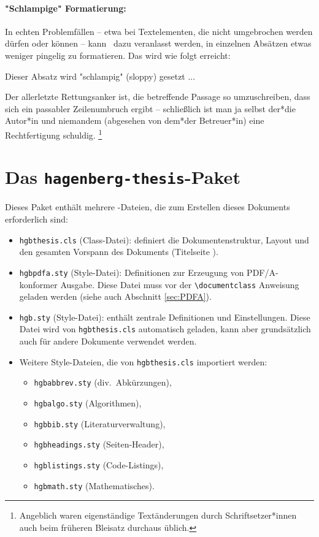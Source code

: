 \paragraph{"Schlampige" Formatierung:} In echten Problemfällen -- etwa bei
Textelementen, die nicht umgebrochen werden dürfen oder können -- kann
\latex\ dazu veranlasst werden, in einzelnen Absätzen etwas weniger pingelig
zu formatieren. Das wird wie folgt erreicht:
%
\begin{LaTeXCode}[numbers=none]
\begin{sloppypar}
	Dieser Absatz wird "schlampig" (sloppy) gesetzt ...
\end{sloppypar}
\end{LaTeXCode}
%
Der allerletzte Rettungsanker ist, die betreffende Passage so umzuschreiben,
dass sich ein passabler Zeilenumbruch ergibt -- schließlich ist man ja selbst
der*die Autor*in und niemandem (abgesehen von dem*der Betreuer*in) eine
Rechtfertigung schuldig.%
\footnote{Angeblich waren eigenständige Textänderungen durch Schriftsetzer*innen
auch beim früheren Bleisatz durchaus üblich.}


\section{Das \texttt{hagenberg-thesis}-Paket}

Dieses Paket enthält mehrere \latex-Dateien, die zum Erstellen dieses
Dokuments erforderlich sind:
%
\begin{itemize}
  \item \nolinkurl{hgbthesis.cls} (Class-Datei): definiert die
    Dokumentenstruktur, Layout und den gesamten Vorspann des Dokuments
    (Titelseite \etc).
  \item \nolinkurl{hgbpdfa.sty} (Style-Datei): Definitionen zur
    Erzeugung von PDF/A-konformer Ausgabe. Diese Datei muss vor
    der \verb!\documentclass! Anweisung geladen werden (siehe auch Abschnitt 
    \ref{sec:PDFA}).
  \item \nolinkurl{hgb.sty} (Style-Datei): enthält zentrale Definitionen
    und Einstellungen. Diese Datei wird von \nolinkurl{hgbthesis.cls}
    automatisch geladen, kann aber grundsätzlich auch für andere Dokumente
    verwendet werden.
  \item Weitere Style-Dateien, die von \nolinkurl{hgbthesis.cls} importiert
    werden:
    \begin{itemize}
			\item[] \nolinkurl{hgbabbrev.sty} (div.\ Abkürzungen),
			\item[] \nolinkurl{hgbalgo.sty} (Algorithmen),
			\item[] \nolinkurl{hgbbib.sty} (Literaturverwaltung),
			\item[] \nolinkurl{hgbheadings.sty} (Seiten-Header),
			\item[] \nolinkurl{hgblistings.sty} (Code-Listings),
			\item[] \nolinkurl{hgbmath.sty} (Mathematisches).
    \end{itemize}
\end{itemize}


